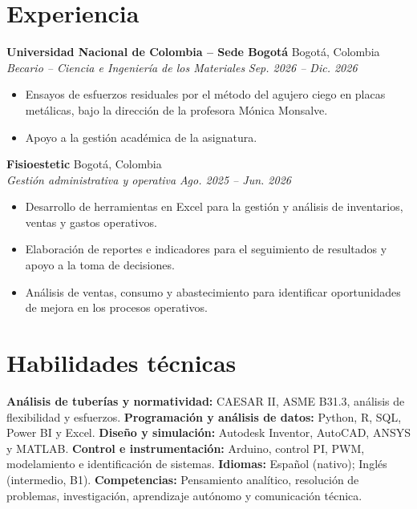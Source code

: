 \documentclass[9pt,letterpaper]{article}
\newcommand{\resumeSubheading}[4]{\textbf{#1} \hfill #2\\[-1pt]\textit{#3} \hfill \textit{#4}\\[-1pt]}
\begin{document}
\section{Experiencia}
\resumeSubheading{Universidad Nacional de Colombia -- Sede Bogotá}{Bogotá, Colombia}{Becario -- Ciencia e Ingeniería de los Materiales}{Sep. 2026 -- Dic. 2026}
\begin{itemize}
\item Ensayos de esfuerzos residuales por el método del agujero ciego en placas metálicas, bajo la dirección de la profesora Mónica Monsalve.
\item Apoyo a la gestión académica de la asignatura.
\end{itemize}
\resumeSubheading{Fisioestetic}{Bogotá, Colombia}{Gestión administrativa y operativa}{Ago. 2025 -- Jun. 2026}
\begin{itemize}
\item Desarrollo de herramientas en Excel para la gestión y análisis de inventarios, ventas y gastos operativos.
\item Elaboración de reportes e indicadores para el seguimiento de resultados y apoyo a la toma de decisiones.
\item Análisis de ventas, consumo y abastecimiento para identificar oportunidades de mejora en los procesos operativos.
\end{itemize}
\section{Habilidades técnicas}
\textbf{Análisis de tuberías y normatividad:} CAESAR II, ASME B31.3, análisis de flexibilidad y esfuerzos.
\textbf{Programación y análisis de datos:} Python, R, SQL, Power BI y Excel.
\textbf{Diseño y simulación:} Autodesk Inventor, AutoCAD, ANSYS y MATLAB.
\textbf{Control e instrumentación:} Arduino, control PI, PWM, modelamiento e identificación de sistemas.
\textbf{Idiomas:} Español (nativo); Inglés (intermedio, B1).
\textbf{Competencias:} Pensamiento analítico, resolución de problemas, investigación, aprendizaje autónomo y comunicación técnica.
\end{document}
